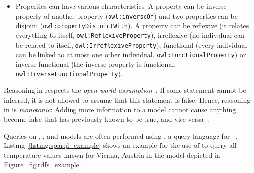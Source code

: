 \begin{itemize}
  \item Properties can have various characteristics: A property can be inverse property of another property (\texttt{owl:inverseOf}) and two properties can be disjoint (\texttt{owl:property\hspace{0pt}Disjoint\hspace{0pt}With}). A property can be reflexive (it relates everything to itself, \texttt{owl:\hspace{0pt}Reflexive\hspace{0pt}Property}), irreflexive (no individual can be related to itself, \texttt{owl:\hspace{0pt}Irreflexive\hspace{0pt}Property}), functional (every individual can be linked to at most one other individual, \texttt{owl:\hspace{0pt}Functional\hspace{0pt}Property}) or inverse functional (the inverse property is functional, \texttt{owl:\hspace{0pt}Inverse\hspace{0pt}Functional\hspace{0pt}Property}).
\end{itemize}

Reasoning in  respects the \emph{open world assumption}~\cite{open_world_assumption1,open_world_assumption2}. If some statement cannot be inferred, it is not allowed to assume that this statement is false. Hence, reasoning in  is \emph{monotonic}: Adding more information to a model cannot cause anything become false that has previously known to be true, and vice versa~\cite{MonotonicReasoning}.

Queries on , , and  models are often performed using , a query language for ~\cite{SPARQL}. Listing~\ref{listing:sparql_example} shows an example for the use of  to query all temperature values known for Vienna, Austria in the  model depicted in Figure~\ref{fig:rdfs_example}.


